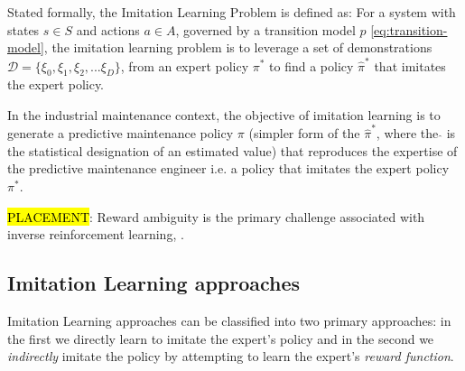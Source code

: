 \documentclass{article}
\newcommand{\hlc}[2][blue!10]{{\colorlet{foo}{#1} \sethlcolor{foo}\hl{#2}}}
\begin{document}
Stated formally, the Imitation Learning Problem is defined as: For a system with states $s \in S$ and actions $a \in A$, governed by a transition model $p$ \eqref{eq:transition-model}, the imitation learning problem is to leverage a set of demonstrations $\mathcal{D} = \{\xi_0, \xi_1, \xi_2, ... \xi_D\}$, from an expert policy  $\pi^{*}$ to find a policy $\hat{\pi}^{*}$ that imitates the expert policy.

In the industrial maintenance context, the objective of imitation learning is to generate a predictive maintenance policy $\pi$ (simpler form of the $\hat{\pi}^{*}$, where the $\hat{}$ is the statistical designation of an estimated value) that reproduces the expertise of the predictive maintenance engineer i.e. a policy that imitates the expert policy $\pi^{*}$.

\hlc{PLACEMENT}: Reward ambiguity is the primary challenge associated with inverse reinforcement learning, \citep{ng2000algorithms, stanford-lectures, baheri2023}.


\subsection{Imitation Learning approaches} 

Imitation Learning approaches can be classified into two primary approaches: in the first we directly learn to imitate the expert's policy and in the second we \textit{indirectly} imitate the policy by attempting to learn the expert's \textit{reward function}. 

	
\end{document}
